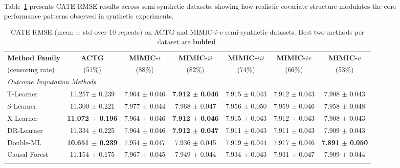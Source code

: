 \documentclass{article} %
\newcommand{\rebuttal}[1]{\textcolor{black}{#1}}
\begin{document}
Table~\ref{tab:semi-syn-cate-rmse} presents CATE RMSE results across semi-synthetic datasets, showing how realistic covariate structure modulates the core performance patterns observed in synthetic experiments. %

\begin{table}[htbp]
    \caption{CATE RMSE (mean $\pm$ std over 10 repeats) on ACTG and MIMIC-$i$-$v$ semi-synthetic datasets. Best two methods per dataset are \textbf{bolded}.}
    \label{tab:semi-syn-cate-rmse}
    \begin{center}
    \begin{adjustbox}{max width = 0.9\textwidth}
    \begin{tabular}{lcccccc}
    \toprule
        \textbf{Method Family} & \textbf{ACTG} & \textbf{MIMIC-$i$} & \textbf{MIMIC-$ii$} & \textbf{MIMIC-$iii$} & \textbf{MIMIC-$iv$} & \textbf{MIMIC-$v$} \\ 
        (censoring rate) & (51\%) & (88\%) & (82\%) & (74\%) & (66\%) & (53\%) \\
        \midrule
        \multicolumn{7}{l}{\textit{Outcome Imputation Methods}} \\
        T-Learner & 11.257 $\pm$ 0.239 & 7.964 $\pm$ 0.046 & \textbf{7.912 $\pm$ 0.046} & 7.915 $\pm$ 0.043 & 7.912 $\pm$ 0.043 & 7.908 $\pm$ 0.043 \\ 
        S-Learner & 11.300 $\pm$ 0.221 & 7.977 $\pm$ 0.044 & 7.968 $\pm$ 0.047 & 7.956 $\pm$ 0.050 & 7.959 $\pm$ 0.046 & 7.958 $\pm$ 0.048 \\ 
        X-Learner & \textbf{11.072 $\pm$ 0.196} & 7.964 $\pm$ 0.046 & \textbf{7.912 $\pm$ 0.046} & 7.915 $\pm$ 0.043 & 7.912 $\pm$ 0.043 & 7.908 $\pm$ 0.043 \\ 
        DR-Learner & 11.334 $\pm$ 0.225 & 7.964 $\pm$ 0.046 & \textbf{7.912 $\pm$ 0.047} & 7.911 $\pm$ 0.043 & 7.911 $\pm$ 0.043 & 7.909 $\pm$ 0.043 \\ 
        Double-ML & \textbf{10.651 $\pm$ 0.239} & 7.954 $\pm$ 0.047 & 7.936 $\pm$ 0.045 & 7.919 $\pm$ 0.044 & 7.917 $\pm$ 0.046 & \textbf{7.891 $\pm$ 0.050} \\ 
        Causal Forest & 11.154 $\pm$ 0.175 & 7.967 $\pm$ 0.045 & 7.949 $\pm$ 0.044 & 7.934 $\pm$ 0.043 & 7.931 $\pm$ 0.047 & 7.909 $\pm$ 0.044 \\ 
        \addlinespace %
        \multicolumn{7}{l}{\textit{Direct-Survival CATE Methods}} \\

\end{tabular}
\end{adjustbox}
\end{center}
\end{table}
\end{document}

